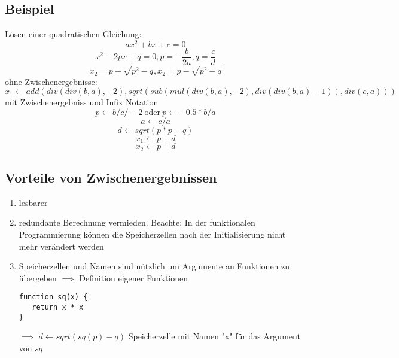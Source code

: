 \documentclass[a4paper]{scrartcl}
\begin{document}
\subsection{Beispiel}
\label{sec-6-1}
Lösen einer quadratischen Gleichung:
\[ax^2 + bx + c = 0\]
\[x^2 - 2px + q = 0, p = -\frac{b}{2a},q=\frac{c}{d}\]
\[x_2 = p + \sqrt{p^2 - q},x_2 = p - \sqrt{p^2 - q}\]
ohne Zwischenergebnisse:
\[x_1 \leftarrow add(div(div(b,a),-2),sqrt(sub(mul(div(b,a),-2),div(div(b,a)-1)),div(c,a)))\]
mit Zwischenergebniss und Infix Notation
\[p\leftarrow b / c / -2~\text{oder}~p\leftarrow -0.5 * b / a\]
\[a\leftarrow c / a\]
\[d\leftarrow sqrt(p*p - q)\]
\[x_1\leftarrow p + d\]
\[x_2\leftarrow p - d\]
\subsection{Vorteile von Zwischenergebnissen}
\label{sec-6-2}
\begin{enumerate}
\item lesbarer
\item redundante Berechnung vermieden. Beachte: In der funktionalen Programmierung können die Speicherzellen nach der Initialisierung nicht mehr verändert werden
\item Speicherzellen und Namen sind nützlich um Argumente an Funktionen zu übergeben $\implies$ Definition eigener Funktionen
\begin{verbatim}
function sq(x) {
   return x * x
}
\end{verbatim}
$\implies$ $d \leftarrow sqrt(sq(p) - q)$
Speicherzelle mit Namen "x" für das Argument von $sq$
\end{enumerate}
\end{document}
